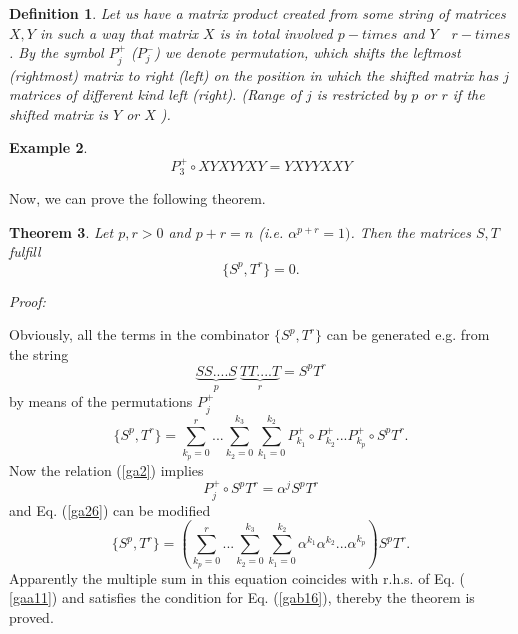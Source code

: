 \documentclass[a4paper,a4paper]{article}
\newtheorem{theorem}{Theorem}
\newtheorem{definition}[theorem]{Definition}
\newtheorem{example}[theorem]{Example}
\begin{document}
\begin{definition}
Let us have a matrix product created from some string of matrices $X,Y$ in
such a way that matrix $X$ is in total involved $p-times$ and $Y\quad
r-times $. By the symbol $P_j^{+}$ ($P_j^{-}$) we denote permutation, which
shifts the leftmost (rightmost) matrix to right (left) on the position in
which the shifted matrix has $j$ matrices of different kind left (right).
(Range of $j$ is restricted by $p$ or $r$ if the shifted matrix is $Y$ or $X$%
).
\end{definition}

\begin{example}
\begin{equation}  \label{ga24}
P_3^{+}\circ XYXYYXY=YXYYXXY
\end{equation}
\end{example}

\noindent Now, we can prove the following theorem.

\begin{theorem}
\label{tst}Let $p,r>0$ and $p+r=n$ (i.e. $\alpha ^{p+r}=1)$. Then the
matrices $S,T$ fulfill 
\begin{equation}  \label{ga25}
\{S^p,T^r\}=0.
\end{equation}
\end{theorem}

\noindent \textit{Proof:}

\noindent Obviously, all the terms in the combinator $\{S^{p},T^{r}\}$ can
be generated e.g. from the string 
\begin{equation*}
\underset{p}{{\underbrace{SS....S}}}{\ }\underset{r}{{\underbrace{TT....T}}}%
=S^{p}T^{r}
\end{equation*}%
by means of the permutations $P_{j}^{+}$%
\begin{equation}
\{S^{p},T^{r}\}=\sum_{k_{p}=0}^{r}...\sum_{k_{2}=0}^{k_{3}}%
\sum_{k_{1}=0}^{k_{2}}P_{k_{1}}^{+}\circ P_{k_{2}}^{+}...P_{k_{p}}^{+}\circ
S^{p}T^{r}.  \label{ga26}
\end{equation}%
Now the relation (\ref{ga2}) implies%
\begin{equation*}
P_{j}^{+}\circ S^{p}T^{r}=\alpha ^{j}S^{p}T^{r}
\end{equation*}%
and Eq. (\ref{ga26}) can be modified 
\begin{equation}
\{S^{p},T^{r}\}=\left(
\sum_{k_{p}=0}^{r}...\sum_{k_{2}=0}^{k_{3}}\sum_{k_{1}=0}^{k_{2}}\alpha
^{k_{1}}\alpha ^{k_{2}}...\alpha ^{k_{p}}\right) S^{p}T^{r}.  \label{gaa26}
\end{equation}%
Apparently the multiple sum in this equation coincides with r.h.s. of Eq. (%
\ref{gaa11}) and satisfies the condition for Eq. (\ref{gab16}), thereby the
theorem is proved.
\end{document}
